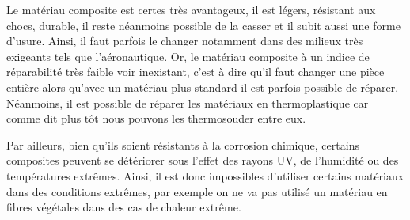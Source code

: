 \begin{itemize}
Le matériau composite est certes très avantageux, il est légers, résistant aux chocs, durable, il reste néanmoins possible de la casser et il subit aussi une forme d’usure.
Ainsi, il faut parfois le changer notamment dans des milieux très exigeants tels que l’aéronautique.
Or, le matériau composite à un indice de réparabilité très faible voir inexistant, c’est à dire qu’il faut changer une pièce entière alors qu’avec un matériau plus standard il est parfois possible de réparer.
Néanmoins, il est possible de réparer les matériaux en thermoplastique car comme dit plus tôt nous pouvons les thermosouder entre eux.


Par ailleurs, bien qu’ils soient résistants à la corrosion chimique, certains composites peuvent se détériorer sous l'effet des rayons UV, de l'humidité ou des températures extrêmes.
Ainsi, il est donc impossibles d’utiliser certains matériaux dans des conditions extrêmes, par exemple on ne va pas utilisé un matériau en fibres végétales dans des cas de chaleur extrême.




\end{itemize}


